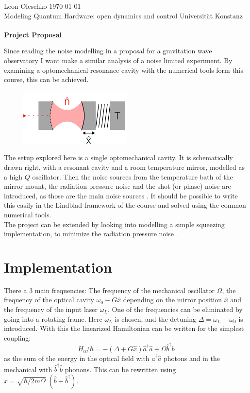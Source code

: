 \documentclass[
	a4page,
	parskip=full,
	12pt
]{scrartcl}
\begin{document}
{
	\sffamily\noindent
	Leon Oleschko \hfill \today\\
	Modeling Quantum Hardware: open dynamics and control \hfill Universität Konstanz\\
	\vspace*{1cm}\\
	\textbf{\huge Project Proposal}
}

Since reading the noise modelling in a proposal for a gravitation wave observatory \autocite{rainer_weiss_electronically_1972}
I want make a similar analysis of a noise limited experiment.
By examining a optomechanical resonance cavity with the numerical tools form this course, this can be achieved.

\begin{figure}
	\includegraphics{figures/drawing.pdf}
\end{figure}
The setup explored here is a single optomechanical cavity. 
It is schematically drawn right, with a resonant cavity and a room temperature mirror, modelled as a high $Q$ oscillator.
Then the noise sources from the temperature bath of the mirror mount, the radiation pressure noise and the shot (or phase) noise are introduced, as those are the main noise sources \autocite{aspelmeyer_cavity_2014-1}.
It should be possible to write this easily in the Lindblad framework of the course and solved using the common numerical tools.\\
The project can be extended by looking into modelling a simple squeezing implementation, to minimize the radiation pressure noise \autocite{caves_quantum-mechanical_1980,aspelmeyer_cavity_2014-1}.

\section*{Implementation}
There a 3 main frequencies: The frequency of the mechanical oscillator $\Omega$, the frequency of the optical cavity $\omega_0 - G \hat x$ depending on the mirror position $\hat x$ and the frequency of the input laser $\omega_L$. \autocite{aspelmeyer_cavity_2014-1}
One of the frequencies can be eliminated by going into a rotating frame. 
Here $\omega_L$ is chosen, and the detuning $\Delta = \omega_L - \omega_0$ is introduced.
With this the linearized Hamiltonian can be written for the simplest coupling:$$
	H_0 / \hbar = - (\Delta + G \hat x) \hat a^\dagger \hat a + \Omega \hat b^\dagger b
$$
as the sum of the energy in the optical field with $\hat a^\dagger \hat a$ photons and in the mechanical with $\hat b^\dagger \hat b$ phonons.
This can be rewritten using $\hat x = \sqrt{\hbar / 2m\Omega} \;(\hat b + \hat b^\dagger)$.
\end{document}
